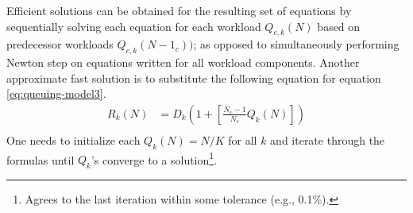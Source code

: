    Efficient solutions can be obtained for the resulting set of equations by sequentially solving each equation for each workload $Q_{c,k}(N)$ based on predecessor workloads $Q_{c,k}(N-1_c))$; as opposed to simultaneously performing Newton step on equations written for all workload components. Another approximate fast solution is to substitute the following equation for equation \ref{eq:queuing-model3}. 
   \begin{equation}\label{eq:queue-length-rt}\begin{split}  
       R_{k}(N) &= D_{k}\left(1+\left[\frac{N_c-1}{N_c}Q_{k}(N)\right]\right)   \\
  \end{split}\end{equation} 
One needs to initialize each $Q_{k}(N)=N/K$ for all $k$ and iterate through the formulas until $Q_k$'s converge to a solution\footnote{Agrees to the last iteration within some tolerance (e.g., 0.1\%). }.  

%
%
 
